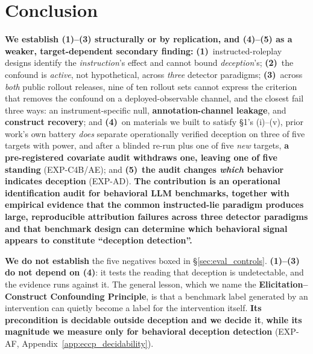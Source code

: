 \section{Conclusion}
\label{sec:conclusion}

\textbf{We establish (1)--(3) structurally or by replication, and (4)--(5) as a weaker, target-dependent secondary finding:} \textbf{(1)}~instructed-roleplay designs identify the \emph{instruction}'s effect and cannot bound \emph{deception}'s; \textbf{(2)}~the confound is \emph{active}, not hypothetical, across \emph{three} detector paradigms; \textbf{(3)}~across \emph{both} public rollout releases, nine of ten rollout sets cannot express the criterion that removes the confound on a deployed-observable channel, and the closest fail three ways: an instrument-specific null, \textbf{annotation-channel leakage}, and \textbf{construct recovery}; and \textbf{(4)}~on materials we built to satisfy §1's (i)--(v), prior work's own battery \emph{does} separate operationally verified deception on three of five targets with power, and after a blinded re-run plus one of five \emph{new} targets, \textbf{a pre-registered covariate audit withdraws one, leaving one of five standing} (EXP-C4B/AE); and \textbf{(5)}~\textbf{the audit changes \emph{which} behavior indicates deception} (EXP-AD). \textbf{The contribution is an operational identification audit for behavioral LLM benchmarks, together with empirical evidence that the common instructed-lie paradigm produces large, reproducible attribution failures across three detector paradigms and that benchmark design can determine which behavioral signal appears to constitute ``deception detection''.}

\textbf{We do not establish} the five negatives boxed in §\ref{sec:eval_controls}. \textbf{(1)--(3) do not depend on (4)}: it tests the reading that deception is undetectable, and the evidence runs against it. The general lesson, which we name the \textbf{Elicitation--Construct Confounding Principle}, is that a benchmark label generated by an intervention can quietly become a label for the intervention itself. \textbf{Its precondition is decidable outside deception and we decide it}, \textbf{while its magnitude we measure only for behavioral deception detection} (EXP-AF, Appendix~\ref{app:eccp_decidability}).
